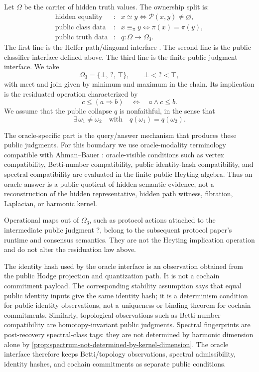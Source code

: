 Let \(\Omega\) be the carrier of hidden truth values. The ownership split is:
\[
\begin{array}{rcl}
\text{hidden equality} &:&
  x\simeq y\Longleftrightarrow \mathcal P(x,y)\neq\varnothing,\\[2pt]
\text{public class data} &:&
  x\equiv_\pi y\Longleftrightarrow \pi(x)=\pi(y),\\[2pt]
\text{public truth data} &:&
  q:\Omega\longrightarrow\Omega_3 .
\end{array}
\]
The first line is the Helfer path/diagonal interface
\cite[Section~2]{helfer2019fol}. The second line is the public classifier interface
defined above. The third line is the finite public judgment interface. We take
\[
  \Omega_3=\{\bot,\, ?,\, \top\},
  \qquad
  \bot< ? <\top,
\]
with meet and join given by minimum and maximum in the chain. Its implication
is the residuated operation characterized by
\[
  c\le (a\Rightarrow b)
  \quad\Longleftrightarrow\quad
  a\wedge c\le b.
\]
We assume that the public collapse \(q\) is nonfaithful, in the sense that
\[
  \exists\,\omega_1\ne\omega_2
  \quad\text{with}\quad
  q(\omega_1)=q(\omega_2).
\]

The oracle-specific part is the query/answer mechanism that produces these
public judgments. For this boundary we use oracle-modality terminology
compatible with Ahman--Bauer \cite{ahmanBauer2026oracle}: oracle-visible
conditions such as vertex compatibility, Betti-number compatibility, public
identity-hash compatibility, and spectral compatibility are evaluated in the
finite public Heyting algebra.
Thus an oracle answer is a public quotient of hidden semantic evidence, not a
reconstruction of the hidden representative, hidden path witness, fibration,
Laplacian, or harmonic kernel.

Operational maps out of \(\Omega_3\), such as protocol actions attached to the
intermediate public judgment \(?\), belong to the subsequent protocol paper's
runtime and consensus semantics. They are not the Heyting implication operation
and do not alter the residuation law above.

The identity hash used by the oracle interface is an observation obtained from
the public Hodge projection and quantization path. It is not a cochain
commitment payload. The corresponding stability assumption says that equal
public identity inputs give the same identity hash; it is a determinism
condition for public identity observations, not a uniqueness or binding theorem
for cochain commitments.
Similarly, topological observations such as Betti-number compatibility are
homotopy-invariant public judgments. Spectral fingerprints are post-recovery
spectral-class tags: they are not determined by harmonic dimension alone by
\cref{prop:spectrum-not-determined-by-kernel-dimension}. The oracle interface
therefore keeps Betti/topology observations, spectral admissibility, identity
hashes, and cochain commitments as separate public conditions.

